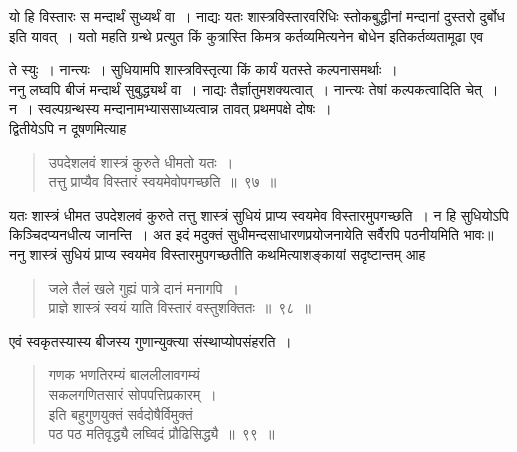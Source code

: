 \documentclass[11pt, openany]{book}
\begin{document}
यो हि विस्तारः स मन्दार्थं सुध्यर्थं वा~। नाद्यः यतः शास्त्रविस्तारवरिधिः
स्तोकबुद्धीनां मन्दानां दुस्तरो दुर्बोध इति यावत्~। यतो महति ग्रन्थे 
प्रत्युत किं कुत्रास्ति किमत्र कर्तव्यमित्यनेन बोधेन इतिकर्तव्यतामूढा एव
\newpage

\noindent ते स्युः~। नान्त्यः~। सुधियामपि शास्त्रविस्तृत्या किं कार्यं यतस्ते
कल्पनासमर्थाः~। \\

\vspace{-3mm}
 ननु लघ्वपि बीजं मन्दार्थं सुबुद्ध्यर्थं वा~। नाद्यः तैर्ज्ञातुमशक्यत्वात्~। नान्त्यः तेषां कल्पकत्वादिति चेत्~। न~। स्वल्पग्रन्थस्य मन्दानामभ्याससाध्यत्वान्न तावत् प्रथमपक्षे दोषः~। \\

\vspace{-3mm}
 द्वितीयेऽपि न दूषणमित्याह\textendash
\begin{quote}
    \bs
     उपदेशलवं शास्त्रं कुरुते धीमतो यतः~। \\
 तत्तु प्राप्यैव विस्तारं स्वयमेवोपगच्छति~॥~९७~॥~
\end{quote}
 
यतः शास्त्रं धीमत उपदेशलवं कुरुते तत्तु शास्त्रं सुधियं प्राप्य स्वयमेव
विस्तारमुपगच्छति~। न हि सुधियोऽपि किञ्चिदप्यनधीत्य जानन्ति~। अत इदं 
मदुक्तं सुधीमन्दसाधारणप्रयोजनायेति सर्वैरपि पठनीयमिति भावः॥ \\

\vspace{-3mm}
 ननु शास्त्रं सुधियं प्राप्य स्वयमेव विस्तारमुपगच्छतीति कथमित्याशङ्कायां सदृष्टान्तम् आह\textendash 
\begin{quote}
    \bs
 जले तैलं खले गुह्यं पात्रे दानं मनागपि~। \\
 प्राज्ञे शास्त्रं स्वयं याति विस्तारं वस्तुशक्तितः~॥~९८~॥~
\end{quote}

एवं स्वकृतस्यास्य बीजस्य गुणान्युक्त्या संस्थाप्योपसंहरति~। 
\begin{quote}
    \bs
  गणक भणतिरम्यं बाललीलावगम्यं\\ 

\vspace{-7mm}
\hspace{1cm} सकलगणितसारं सोपपत्तिप्रकारम्~।\\ 

\vspace{-7mm}
 इति बहुगुणयुक्तं सर्वदोषैर्विमुक्तं \\ 

\vspace{-7mm}
\hspace{1cm} पठ पठ मतिवृद्ध्यै लघ्विदं प्रौढिसिद्ध्यै~॥~९९~॥~
\end{quote}
\end{document}
